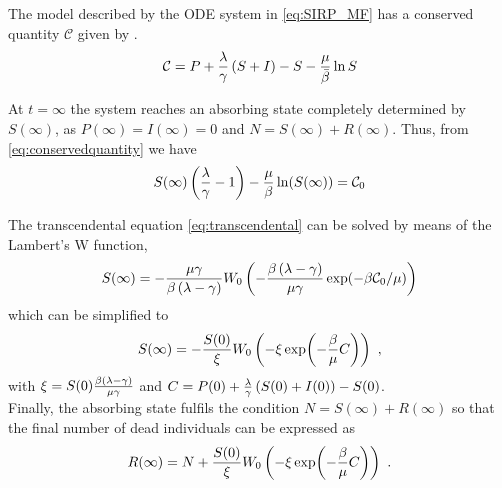 The model described by the ODE system in \cref{eq:SIRP_MF} has a conserved
quantity $\mathcal{C}$ given by \cite{GimenezRomero2021}.
\begin{equation}\label{eq:conservedquantity}
    \mathcal{C}=P +
    \frac{\lambda}{\gamma}\left(S+I\right)-S-\frac{\mu}{\bar{\beta}}\ln S
\end{equation}

At $t=\infty$ the system reaches an absorbing state completely determined
by $S(\infty)$, as $P(\infty)=I(\infty)=0$ and $N=S(\infty)+R(\infty)$. Thus,
from \cref{eq:conservedquantity} we have
\begin{equation}\label{eq:transcendental}
    S(\infty)\left(\frac{\lambda}{\gamma}-1\right)-
    \frac{\mu}{\beta}\ln(S(\infty))=\mathcal{C}_0
\end{equation}

The transcendental equation \cref{eq:transcendental} can be solved by means
of the Lambert's W function,
\begin{equation}
    S(\infty)=-\frac{\mu\gamma}{\beta\left(\lambda-\gamma\right)}
    W_0\left(-\frac{\beta\left(\lambda-\gamma\right)}{\mu\gamma}
        \exp(-\beta\mathcal{C}_0/\mu)\right)
\end{equation}
which can be simplified to
\begin{equation}\label{eq: S_inf}
    S(\infty)=-\frac{S(0)}{\xi}W_0\left(-\xi\exp(-\frac{\beta}{\mu}C)\right)
    \ ,
\end{equation}
with $\xi=S(0)\frac{\beta\left(\lambda-\gamma\right)}{\mu\gamma}$ and
$C=P(0)+\frac{\lambda}{\gamma}\left(S(0)+I(0)\right)-S(0)$.\\

Finally, the absorbing state fulfils the condition $N=S(\infty)+R(\infty)$
so that the final number of dead individuals can be expressed as
\begin{equation}
    R(\infty)=N+\frac{S(0)}{\xi}W_0\left(-\xi\exp(-\frac{\beta}{\mu}C)\right) \
    .
\end{equation}